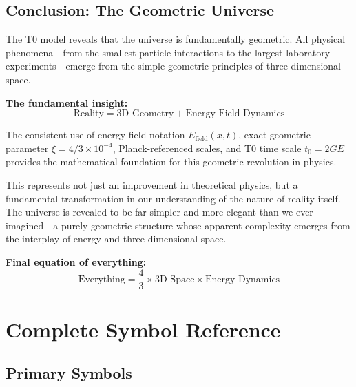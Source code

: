 \documentclass[12pt,a4paper]{report}
\begin{document}
\section{Conclusion: The Geometric Universe}
\label{sec:conclusion_geometric_universe}

The T0 model reveals that the universe is fundamentally geometric. All physical phenomena - from the smallest particle interactions to the largest laboratory experiments - emerge from the simple geometric principles of three-dimensional space.

\textbf{The fundamental insight:}
\begin{equation}
	\text{Reality} = \text{3D Geometry} + \text{Energy Field Dynamics}
\end{equation}

The consistent use of energy field notation $E_{\text{field}}(x,t)$, exact geometric parameter $\xi = 4/3 \times 10^{-4}$, Planck-referenced scales, and T0 time scale $t_0 = 2GE$ provides the mathematical foundation for this geometric revolution in physics.

This represents not just an improvement in theoretical physics, but a fundamental transformation in our understanding of the nature of reality itself. The universe is revealed to be far simpler and more elegant than we ever imagined - a purely geometric structure whose apparent complexity emerges from the interplay of energy and three-dimensional space.

\textbf{Final equation of everything:}
\begin{equation}
	\boxed{\text{Everything} = \frac{4}{3} \times \text{3D Space} \times \text{Energy Dynamics}}
\end{equation}

\appendix
\chapter{Complete Symbol Reference}
\label{app:complete_symbols}

\section{Primary Symbols}
\label{sec:primary_symbols}
\end{document}
